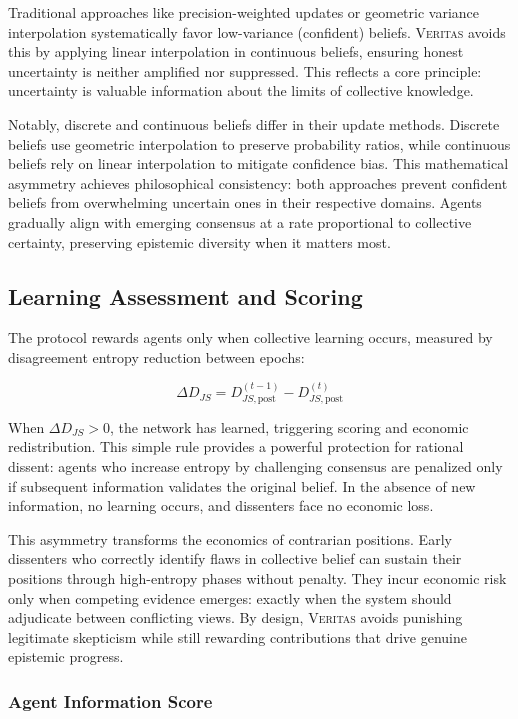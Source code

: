 \documentclass[11pt,a4paper]{article}
\newcommand{\veritas}{\textsc{Veritas}}
\begin{document}
Traditional approaches like precision-weighted updates or geometric variance interpolation systematically favor low-variance (confident) beliefs. \veritas{} avoids this by applying linear interpolation in continuous beliefs, ensuring honest uncertainty is neither amplified nor suppressed. This reflects a core principle: uncertainty is valuable information about the limits of collective knowledge.

Notably, discrete and continuous beliefs differ in their update methods. Discrete beliefs use geometric interpolation to preserve probability ratios, while continuous beliefs rely on linear interpolation to mitigate confidence bias. This mathematical asymmetry achieves philosophical consistency: both approaches prevent confident beliefs from overwhelming uncertain ones in their respective domains. Agents gradually align with emerging consensus at a rate proportional to collective certainty, preserving epistemic diversity when it matters most.

\subsection{Learning Assessment and Scoring}

The protocol rewards agents only when collective learning occurs, measured by disagreement entropy reduction between epochs:

$$\Delta D_{JS} = D_{JS,\text{post}}^{(t-1)} - D_{JS,\text{post}}^{(t)}$$

When $\Delta D_{JS} > 0$, the network has learned, triggering scoring and economic redistribution. This simple rule provides a powerful protection for rational dissent: agents who increase entropy by challenging consensus are penalized only if subsequent information validates the original belief. In the absence of new information, no learning occurs, and dissenters face no economic loss.

This asymmetry transforms the economics of contrarian positions. Early dissenters who correctly identify flaws in collective belief can sustain their positions through high-entropy phases without penalty. They incur economic risk only when competing evidence emerges: exactly when the system should adjudicate between conflicting views. By design, \veritas{} avoids punishing legitimate skepticism while still rewarding contributions that drive genuine epistemic progress.

\subsubsection*{Agent Information Score}
\end{document}
